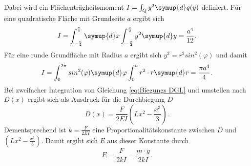 Dabei wird ein Flächenträgheitsmoment $I=\int_Q y^2 \symup{d}q(y)$ definiert. Für eine quadratische Fläche mit Grundseite $a$ ergibt sich
\begin{equation}
    I=\int_{-\frac{a}{2}}^{\frac{a}{2}}\symup{d}x\int_{-\frac{a}{2}}^{\frac{a}{2}} y^2 \symup{d}y=\frac{a^4}{12}\text{.}
    \label{eq:I_Rechteck}
\end{equation}
Für eine runde Grundfläche mit Radius $a$ ergibt sich $y^2=r^2sin^2(\varphi)$ und damit
\begin{equation}
    I=\int_{0}^{2\pi}sin^2(\varphi)\symup{d}\varphi\int_{0}^{a} r^2 \cdot r\symup{d}r=\frac{\pi a^4}{4}\text{.}
    \label{eq:I_Kreis}
\end{equation}
Bei zweifacher Integration von Gleichung \eqref{eq:Biegungs DGL} und umstellen nach $D(x)$ ergibt
sich als Ausdruck für die Durchbiegung $D$
\begin{equation}
    D(x)=\frac{F}{2EI}(Lx^2-\frac{x^3}{3}) \text{.}
    \label{eq:Biegung1}
\end{equation}
Dementsprechend ist $k=\frac{F}{2EI}$ eine Proportionalitätskonstante zwischen $D$ und $(Lx^2-\frac{x^3}{3})$.
Damit ergibt sich $E$ aus dieser Konstante durch
\begin{equation}
    E=\frac{F}{2kI}=\frac{m\cdot g}{2kI} \text{.}
    \label{eq:1Konstante}
\end{equation}
